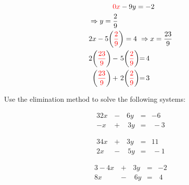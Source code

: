 \documentclass[../mathNotesPreamble]{subfiles}
\begin{document}
{{\begin{minipage}[t]{0.45\linewidth}
\begin{align*}
      &\phantom{\Rightarrow}\hspace*{24pt}\textcolor{red}{0x}-9y=-2\\
      &\Rightarrow y=\frac{2}{9}\\
      & 2x-5\parens{\textcolor{red}{\frac{2}{9}}}=4
      \ \Rightarrow x=\frac{23}{9}\\
        &\begin{array}{*{3}{@{}r@{}l}}
          2\parens{\textcolor{red}{\displaystyle\frac{23}{9}}}&\,-\,&5\parens{\textcolor{red}{\displaystyle\frac{2}{9}}}&=&4\\[10pt]
          \parens{\textcolor{red}{\displaystyle\frac{23}{9}}}&\,+&\,2\parens{\textcolor{red}{\displaystyle\frac{2}{9}}}&=&\,3
      \end{array}
    \end{align*}
    \end{minipage}%
    \vspace*{5pt}
  }}
  \pagebreak

  \begin{ex*}
    Use the elimination method to solve the following systems:
  \end{ex*}
  \noindent
  \begin{minipage}{0.25\linewidth}
    \begin{alignat*}{3}
      2x&\,-\,&6y&=&-6\\
      -x&\,+&\,3y&=&\,-3
    \end{alignat*}
  \end{minipage}%

  \noindent
  \begin{minipage}{0.25\linewidth}
    \begin{alignat*}{3}
      4x&\,+\,&3y&=&11\\
      2x&\,-&\,5y&=&\,-1
    \end{alignat*}
  \end{minipage}%

  \noindent
  \begin{minipage}{0.25\linewidth}
    \begin{alignat*}{3}
      -4x&\,+\,&3y&=&-2\\
      8x&\,-&\,6y&=&\,4
    \end{alignat*}
  \end{minipage}
  \pagebreak
  
\end{document}
